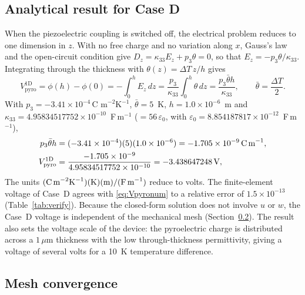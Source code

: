 \documentclass[pdflatex,sn-mathphys-num]{sn-jnl}
\begin{document}
\subsection{Analytical result for Case D}
\label{sec:caseD}

When the piezoelectric coupling is switched off, the electrical problem reduces to one
dimension in $z$. With no free charge and no variation along $x$, Gauss's law and the
open-circuit condition give
$D_z=\kappa_{33}E_z+p_3\theta=0$, so that
$E_z=-p_3\theta/\kappa_{33}$. Integrating through the thickness with
$\theta(z)=\Delta T\,z/h$ gives
\begin{equation}
V_{\mathrm{pyro}}^{\mathrm{1D}}=\phi(h)-\phi(0)
=-\int_0^h E_z\,dz
=\frac{p_3}{\kappa_{33}}\int_0^h\theta\,dz
=\frac{p_3\bar\theta h}{\kappa_{33}},
\qquad
\bar\theta=\frac{\Delta T}{2}.
\label{eq:Vpyro}
\end{equation}
With $p_3=-3.41\times10^{-4}\,\text{C m}^{-2}\text{K}^{-1}$,
$\bar\theta=5$~K, $h=1.0\times10^{-6}$~m and
$\kappa_{33}=4.95834517752\times10^{-10}$~F\,m$^{-1}$
($=56\,\varepsilon_0$, with $\varepsilon_0=8.854187817\times10^{-12}$~F\,m$^{-1}$),
\begin{align}
p_3\bar\theta h
&=(-3.41\times10^{-4})(5)(1.0\times10^{-6})
=-1.705\times10^{-9}\,\text{C\,m}^{-1},
\notag\\
V_{\mathrm{pyro}}^{\mathrm{1D}}
&=\frac{-1.705\times10^{-9}}{4.95834517752\times10^{-10}}
=-3.438647248\,\text{V},
\label{eq:Vpyronum}
\end{align}
The units
$(\text{C\,m}^{-2}\text{K}^{-1})(\text{K})(\text{m})/
(\text{F\,m}^{-1})$ reduce to volts. The finite-element voltage of Case~D agrees
with \eqref{eq:Vpyronum} to a relative error of $1.5\times10^{-13}$
(Table~\ref{tab:verify}). Because the closed-form solution does not involve $u$ or
$w$, the Case~D voltage is independent of the mechanical mesh
(Section~\ref{sec:mesh-convergence}). The result also sets the voltage scale of the
device: the pyroelectric charge is distributed across a $1\,\mu$m thickness with the
low through-thickness permittivity, giving a voltage of several volts for a 10~K
temperature difference.

\subsection{Mesh convergence}
\label{sec:mesh-convergence}
\end{document}
